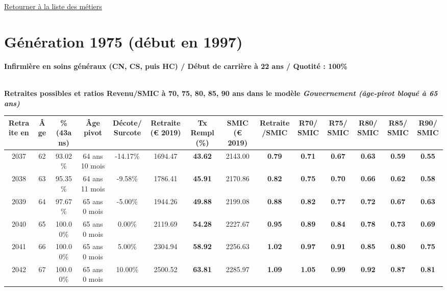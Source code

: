  \hyperlink{page.2}{\noindent Retourner à la liste des métiers}

 \newpage 

\section{Génération 1975 (début en 1997)\label{Infirmier_100_1975_22_0}} 
 
{\bf \noindent Infirmière en soins généraux (CN, CS, puis HC) / Début de carrière à 22 ans / Quotité : 100\%}  ~ 

 ~\\{\bf \noindent Retraites possibles et ratios Revenu/SMIC à 70, 75, 80, 85, 90 ans dans le modèle \emph{Gouvernement (âge-pivot bloqué à 65 ans)}}  
 
\begin{adjustbox}{max width=\textwidth} 
\begin{tabular}[htb]{|c|c||c|c|c||c|c||c|c||c|c|c|c|c|} 
\hline 
 Retraite en &  Âge &  \%(43ans) &  Âge pivot &  Décote/Surcote &  Retraite (\euro{} 2019) &  Tx Rempl(\%) &  SMIC (\euro{} 2019) &  Retraite/SMIC &  R70/SMIC &  R75/SMIC &  R80/SMIC &  R85/SMIC &  R90/SMIC \\ 
\hline \hline 
 2037 &  62 &  93.02\% &  64 ans 10 mois &  -14.17\% &  1694.47 &  {\bf 43.62} &  2143.00 &  {\bf {\color{red} 0.79}} &  {\bf {\color{red} 0.71}} &  {\bf {\color{red} 0.67}} &  {\bf {\color{red} 0.63}} &  {\bf {\color{red} 0.59}} &  {\bf {\color{red} 0.55}} \\ 
\hline 
 2038 &  63 &  95.35\% &  64 ans 11 mois &  -9.58\% &  1786.41 &  {\bf 45.91} &  2170.86 &  {\bf {\color{red} 0.82}} &  {\bf {\color{red} 0.75}} &  {\bf {\color{red} 0.70}} &  {\bf {\color{red} 0.66}} &  {\bf {\color{red} 0.62}} &  {\bf {\color{red} 0.58}} \\ 
\hline 
 2039 &  64 &  97.67\% &  65 ans 0 mois &  -5.00\% &  1944.26 &  {\bf 49.88} &  2199.08 &  {\bf {\color{red} 0.88}} &  {\bf {\color{red} 0.82}} &  {\bf {\color{red} 0.77}} &  {\bf {\color{red} 0.72}} &  {\bf {\color{red} 0.67}} &  {\bf {\color{red} 0.63}} \\ 
\hline 
 2040 &  65 &  100.00\% &  65 ans 0 mois &  0.00\% &  2119.69 &  {\bf 54.28} &  2227.67 &  {\bf {\color{red} 0.95}} &  {\bf {\color{red} 0.89}} &  {\bf {\color{red} 0.84}} &  {\bf {\color{red} 0.78}} &  {\bf {\color{red} 0.73}} &  {\bf {\color{red} 0.69}} \\ 
\hline 
 2041 &  66 &  100.00\% &  65 ans 0 mois &  5.00\% &  2304.94 &  {\bf 58.92} &  2256.63 &  {\bf 1.02} &  {\bf {\color{red} 0.97}} &  {\bf {\color{red} 0.91}} &  {\bf {\color{red} 0.85}} &  {\bf {\color{red} 0.80}} &  {\bf {\color{red} 0.75}} \\ 
\hline 
 2042 &  67 &  100.00\% &  65 ans 0 mois &  10.00\% &  2500.52 &  {\bf 63.81} &  2285.97 &  {\bf 1.09} &  {\bf 1.05} &  {\bf {\color{red} 0.99}} &  {\bf {\color{red} 0.92}} &  {\bf {\color{red} 0.87}} &  {\bf {\color{red} 0.81}} \\ 
\hline 
\hline 
\end{tabular} 
\end{adjustbox} 
 
